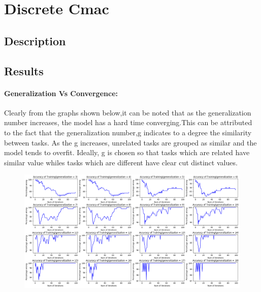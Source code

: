 \documentclass{article}
\begin{document}
\section{Discrete Cmac}
\subsection{Description}
\subsection{Results}
  \paragraph{Generalization Vs Convergence:}
   Clearly from the graphs shown below,it can be noted that  
  as the generalization number increases, the model has a hard time converging.This can
  be attributed to the fact that the generalization number,g indicates to a degree the similarity
  between tasks. As the g increases, unrelated tasks are grouped as similar and the model tends
  to overfit. Ideally, g is chosen so that tasks which are related have similar value whiles tasks
  which are different have clear cut distinct values. 
  \begin{figure}[h!]
    \includegraphics[scale=0.35]{./Results/convergenceVsgeneralization.png}
  \end{figure}
\end{document}
